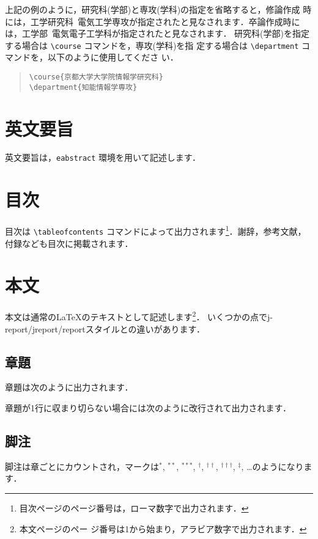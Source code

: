 \documentclass[sotsuron]{kuee}
\begin{document}
上記の例のように，研究科(学部)と専攻(学科)の指定を省略すると，修論作成
時には，工学研究科~電気工学専攻が指定されたと見なされます．卒論作成時に
は，工学部~電気電子工学科が指定されたと見なされます．
%
研究科(学部)を指定する場合は \verb+\course+ コマンドを，専攻(学科)を指
定する場合は \verb+\department+ コマンドを，以下のように使用してくださ
い．
\begin{quote}
\begin{verbatim}
\course{京都大学大学院情報学研究科}
\department{知能情報学専攻}
\end{verbatim}
\end{quote}


\section{英文要旨}
英文要旨は，\verb+eabstract+ 環境を用いて記述します．


\section{目次}
目次は \verb+\tableofcontents+ コマンドによって出力されます\footnote
{目次ページのページ番号は，ローマ数字で出力されます．}．謝辞，参考文献，
付録なども目次に掲載されます．


\section{本文}
本文は通常の\LaTeX のテキストとして記述します\footnote{本文ページのペー
ジ番号は1から始まり，アラビア数字で出力されます．}．
いくつかの点でj-report/jreport/reportスタイルとの違いがあります．

\subsection{章題}
章題は次のように出力されます．


章題が1行に収まり切らない場合には次のように改行されて出力されます．


\subsection{脚注}

脚注は章ごとにカウントされ，マークは$^{*}$, $^{**}$, $^{***}$,
$^{\dagger}$, $^{\dagger\dagger}$, $^{\dagger\dagger\dagger}$,
$^{\ddagger}$, \ldots のようになります．
\end{document}
